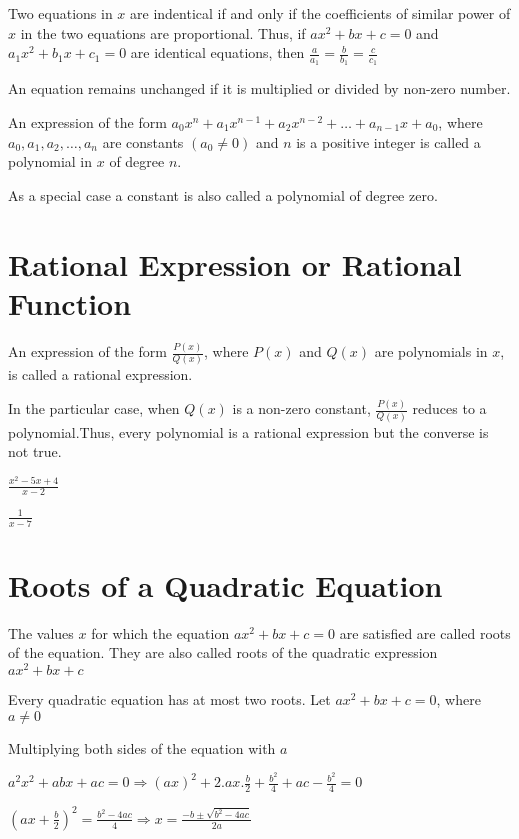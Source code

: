 \startitemize[n]
\item Two equations in $x$ are indentical if and only if the coefficients of similar power of $x$ in the two equations are
  proportional. Thus, if $ax^2 + bx + c = 0$ and $a_1x^2 + b_1x + c_1 = 0$ are identical equations, then $\frac{a}{a_1} =
  \frac{b}{b_1} = \frac{c}{c_1}$
\item An equation remains unchanged if it is multiplied or divided by non-zero number.
\stopitemize

An expression of the form $a_0x^n + a_1x^{n - 1} + a_2x^{n - 2} + \ldots + a_{n - 1}x + a_0$, where $a_0, a_1, a_2, \ldots, a_n$
are constants $(a_0 \neq 0)$ and $n$ is a positive integer is called a polynomial in $x$ of degree $n$.

As a special case a constant is also called a polynomial of degree zero.

\section{Rational Expression or Rational Function}
An expression of the form $\frac{P(x)}{Q(x)}$, where $P(x)$ and $Q(x)$ are polynomials in $x$, is called a rational expression.

In the particular case, when $Q(x)$ is a non-zero constant, $\frac{P(x)}{Q(x)}$ reduces to a polynomial.Thus, every polynomial is a
rational expression but the converse is not true.

\startitemize[n]
\item $\frac{x^2 - 5x + 4}{x - 2}$
\item $\frac{1}{x - 7}$
\stopitemize

\section{Roots of a Quadratic Equation}
The values $x$ for which the equation $ax^2 + bx + c = 0$ are satisfied are called roots of the equation. They are also called
roots of the quadratic expression $ax^2 + bx + c$

Every quadratic equation has at most two roots. Let $ax^2 + bx + c = 0$, where $a\neq 0$

Multiplying both sides of the equation with $a$

$a^2x^2 + abx + ac = 0 \Rightarrow (ax)^2 + 2.ax.\frac{b}{2} + \frac{b^2}{4} + ac - \frac{b^2}{4} = 0$

$\left(ax + \frac{b}{2}\right)^2 = \frac{b^2 - 4ac}{4} \Rightarrow x = \frac{-b \pm\sqrt{b^2 - 4ac}}{2a}$


